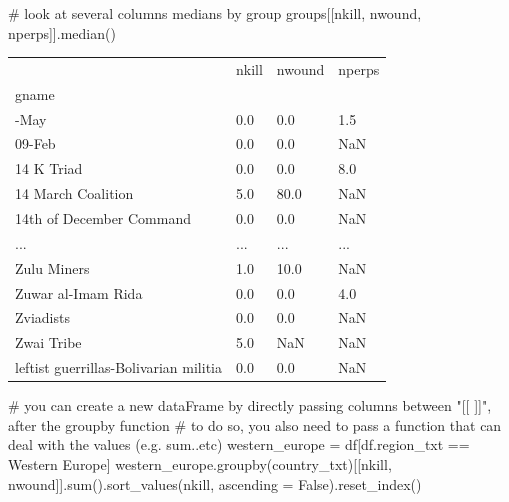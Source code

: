 \documentclass[
  letterpaper,
  DIV=11,
  numbers=noendperiod]{scrreprt}
\newenvironment{Shaded}{\begin{snugshade}}{\end{snugshade}}
\newcommand{\BuiltInTok}[1]{\textcolor[rgb]{0.00,0.23,0.31}{#1}}
\newcommand{\CommentTok}[1]{\textcolor[rgb]{0.37,0.37,0.37}{#1}}
\newcommand{\NormalTok}[1]{\textcolor[rgb]{0.00,0.23,0.31}{#1}}
\newcommand{\OperatorTok}[1]{\textcolor[rgb]{0.37,0.37,0.37}{#1}}
\newcommand{\StringTok}[1]{\textcolor[rgb]{0.13,0.47,0.30}{#1}}
\newcommand{\VariableTok}[1]{\textcolor[rgb]{0.07,0.07,0.07}{#1}}
\begin{document}
\begin{Shaded}
\begin{Highlighting}[]
\CommentTok{\# look at several columns\textquotesingle{} medians by group}
\NormalTok{groups[[}\StringTok{\textquotesingle{}nkill\textquotesingle{}}\NormalTok{, }\StringTok{\textquotesingle{}nwound\textquotesingle{}}\NormalTok{, }\StringTok{\textquotesingle{}nperps\textquotesingle{}}\NormalTok{]].median()}
\end{Highlighting}
\end{Shaded}

\begin{longtable}[]{@{}llll@{}}
\toprule\noalign{}
& nkill & nwound & nperps \\
gname & & & \\
\midrule\noalign{}
\endhead
\bottomrule\noalign{}
\endlastfoot
01-May & 0.0 & 0.0 & 1.5 \\
09-Feb & 0.0 & 0.0 & NaN \\
14 K Triad & 0.0 & 0.0 & 8.0 \\
14 March Coalition & 5.0 & 80.0 & NaN \\
14th of December Command & 0.0 & 0.0 & NaN \\
... & ... & ... & ... \\
Zulu Miners & 1.0 & 10.0 & NaN \\
Zuwar al-Imam Rida & 0.0 & 0.0 & 4.0 \\
Zviadists & 0.0 & 0.0 & NaN \\
Zwai Tribe & 5.0 & NaN & NaN \\
leftist guerrillas-Bolivarian militia & 0.0 & 0.0 & NaN \\
\end{longtable}

\begin{Shaded}
\begin{Highlighting}[]
\CommentTok{\# you can create a new dataFrame by directly passing columns between "[[ ]]", after the groupby function}
\CommentTok{\# to do so, you also need to pass a function that can deal with the values (e.g. sum..etc) }
\NormalTok{western\_europe }\OperatorTok{=}\NormalTok{ df[df.region\_txt }\OperatorTok{==} \StringTok{\textquotesingle{}Western Europe\textquotesingle{}}\NormalTok{]}
\NormalTok{western\_europe.groupby(}\StringTok{\textquotesingle{}country\_txt\textquotesingle{}}\NormalTok{)[[}\StringTok{\textquotesingle{}nkill\textquotesingle{}}\NormalTok{, }\StringTok{\textquotesingle{}nwound\textquotesingle{}}\NormalTok{]].}\BuiltInTok{sum}\NormalTok{().sort\_values(}\StringTok{\textquotesingle{}nkill\textquotesingle{}}\NormalTok{, ascending }\OperatorTok{=} \VariableTok{False}\NormalTok{).reset\_index()}
\end{Highlighting}
\end{Shaded}
\end{document}
